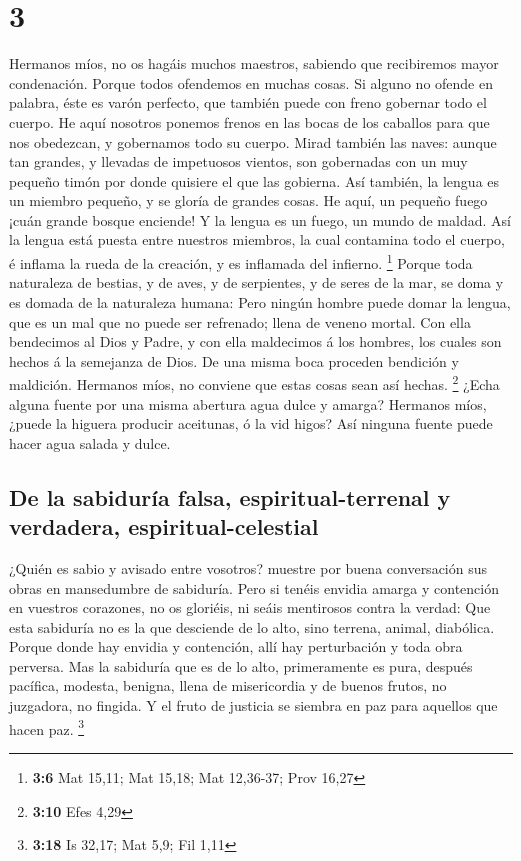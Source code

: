 \hypertarget{section-2}{%
\section{3}\label{section-2}}

 Hermanos míos, no os hagáis muchos maestros, sabiendo que
recibiremos mayor condenación.  Porque todos ofendemos en
muchas cosas. Si alguno no ofende en palabra, éste es varón perfecto,
que también puede con freno gobernar todo el cuerpo.  He
aquí nosotros ponemos frenos en las bocas de los caballos para que nos
obedezcan, y gobernamos todo su cuerpo.  Mirad también las
naves: aunque tan grandes, y llevadas de impetuosos vientos, son
gobernadas con un muy pequeño timón por donde quisiere el que las
gobierna.  Así también, la lengua es un miembro pequeño, y
se gloría de grandes cosas. He aquí, un pequeño fuego ¡cuán grande
bosque enciende!  Y la lengua es un fuego, un mundo de
maldad. Así la lengua está puesta entre nuestros miembros, la cual
contamina todo el cuerpo, é inflama la rueda de la creación, y es
inflamada del infierno. \footnote{\textbf{3:6} Mat 15,11; Mat 15,18; Mat
  12,36-37; Prov 16,27}  Porque toda naturaleza de bestias,
y de aves, y de serpientes, y de seres de la mar, se doma y es domada de
la naturaleza humana:  Pero ningún hombre puede domar la
lengua, que es un mal que no puede ser refrenado; llena de veneno
mortal.  Con ella bendecimos al Dios y Padre, y con ella
maldecimos á los hombres, los cuales son hechos á la semejanza de Dios.
 De una misma boca proceden bendición y maldición. Hermanos
míos, no conviene que estas cosas sean así hechas. \footnote{\textbf{3:10}
  Efes 4,29}  ¿Echa alguna fuente por una misma abertura
agua dulce y amarga?  Hermanos míos, ¿puede la higuera
producir aceitunas, ó la vid higos? Así ninguna fuente puede hacer agua
salada y dulce.

\hypertarget{de-la-sabiduruxeda-falsa-espiritual-terrenal-y-verdadera-espiritual-celestial}{%
\subsection{De la sabiduría falsa, espiritual-terrenal y verdadera,
espiritual-celestial}\label{de-la-sabiduruxeda-falsa-espiritual-terrenal-y-verdadera-espiritual-celestial}}

 ¿Quién es sabio y avisado entre vosotros? muestre por
buena conversación sus obras en mansedumbre de sabiduría. 
Pero si tenéis envidia amarga y contención en vuestros corazones, no os
gloriéis, ni seáis mentirosos contra la verdad:  Que esta
sabiduría no es la que desciende de lo alto, sino terrena, animal,
diabólica.  Porque donde hay envidia y contención, allí hay
perturbación y toda obra perversa.  Mas la sabiduría que es
de lo alto, primeramente es pura, después pacífica, modesta, benigna,
llena de misericordia y de buenos frutos, no juzgadora, no fingida.
 Y el fruto de justicia se siembra en paz para aquellos que
hacen paz. \footnote{\textbf{3:18} Is 32,17; Mat 5,9; Fil 1,11}

